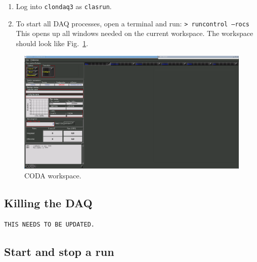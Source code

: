 \documentclass[12pt]{article}
\begin{document}
\begin{enumerate}
\item 
Log into \texttt{clondaq3} as \texttt{clasrun}.
\item 
To start all DAQ processes, open a terminal and run:\newline
\texttt{> runcontrol --rocs}\newline
This opens up all windows needed on the current workspace. The workspace should look like Fig.~\ref{fig:coda}.
\end{enumerate}
\begin{figure}[htbp]
\begin{center}
    \includegraphics[width=\textwidth]{runcontrol_start.png}
\caption{CODA workspace.}
\label{fig:coda}
\end{center}
\vspace*{-5mm}
\end{figure}

\subsection{Killing the DAQ}\label{sec:daqexit}
\begin{verbatim}THIS NEEDS TO BE UPDATED.\end{verbatim}

\subsection{Start and stop a run}
\label{sec:startstop}
\end{document}

